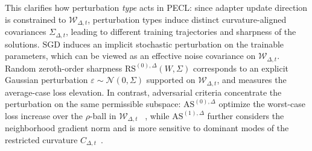 \documentclass{article}
\theoremstyle{plain}
\theoremstyle{definition}
\theoremstyle{remark}
\begin{document}
This clarifies how perturbation \emph{type} acts in PECL: since adapter update direction is constrained to $\mathcal W_{\Delta,t}$, perturbation types induce distinct curvature-aligned covariances $\Sigma_{\Delta,t}$, leading to different training trajectories and sharpness of the solutions. 
SGD induces an implicit stochastic perturbation on the trainable parameters, which can be viewed as an effective noise covariance on $\mathcal W_{\Delta,t}$\cite{pmlr-v97-zhu19e}. Random zeroth-order sharpness $\mathrm{RS}^{(0),\Delta}(W,\Sigma)$ corresponds to an explicit Gaussian perturbation $\varepsilon\sim\mathcal N(0,\Sigma)$ supported on $\mathcal W_{\Delta,t}$, and measures the average-case loss elevation. In contrast, adversarial criteria concentrate the perturbation on the same permissible subspace: $\mathrm{AS}^{(0),\Delta}$ optimize the worst-case loss increase over the $\rho$-ball in $\mathcal W_{\Delta,t}$ ~\cite{foretSharpnessAwareMinimizationEfficiently2021}, while $\mathrm{AS}^{(1),\Delta}$ further considers the neighborhood gradient norm and is more sensitive to dominant modes of the restricted curvature $C_{\Delta,t}$~\cite{Zhang_GAM}. 
\end{document}
